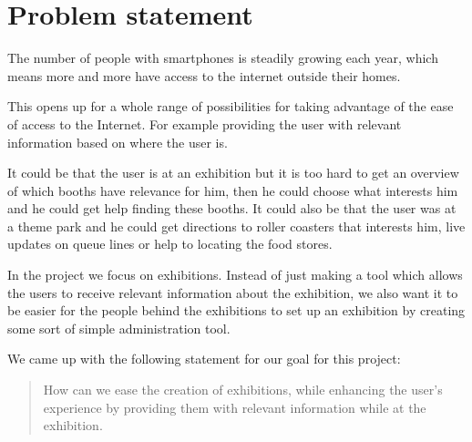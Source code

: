 \section{Problem statement}\label{sec:problemstatement}

The number of people with smartphones is steadily growing each year, which means more and more have access to the internet outside their homes.

This opens up for a whole range of possibilities for taking advantage of the ease of access to the Internet. For example providing the user with relevant information based on where the user is. 

It could be that the user is at an exhibition but it is too hard to get an overview of which booths have relevance for him, then he could choose what interests him and he could get help finding these booths. It could also be that the user was at a theme park and he could get directions to roller coasters that interests him, live updates on queue lines or help to locating the food stores.

In the project we focus on exhibitions. Instead of just making a tool which allows the users to receive relevant information about the exhibition, we also want it to be easier for the people behind the exhibitions to set up an exhibition by creating some sort of simple administration tool.

We came up with the following statement for our goal for this project:

\begin{quote}
How can we ease the creation of exhibitions, while enhancing the user's experience by providing them with relevant information while at the exhibition.
\end{quote}

